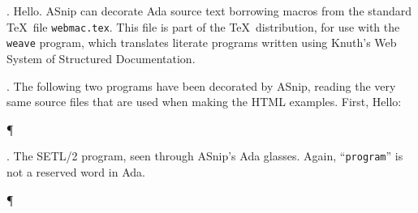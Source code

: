 


\def\C#1{\ifmmode\gdef\XX{\null$\null}\else\gdef\XX{}\fi %
  \XX\hfil\penalty-1\hfilneg\quad#1\XX}%

\def\title{ASnip Demo} %

\def\beginAda{\Y\P}
\def\endAda{\par\fi}


. Hello.
ASnip can decorate Ada source text borrowing macros from the
standard \TeX\ file {\tt webmac.tex}. This file is part of the \TeX\
distribution, for use with the {\tt weave} program, which translates
literate programs written using Knuth's Web System of Structured
Documentation.



. The following two programs have been decorated by ASnip, reading
the very same source files that are used when making the HTML examples.
First, Hello:

\beginAda

\endAda

. The SETL/2 program, seen through ASnip's Ada glasses.
Again, ``{\tt program}'' is not a reserved word in Ada.

\beginAda

\endAda

\bye
